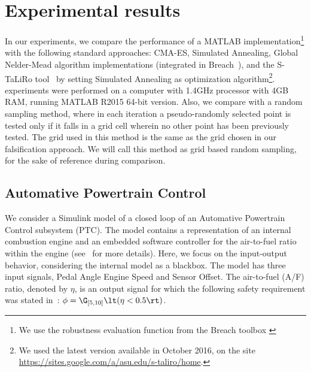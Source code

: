 \section{Experimental results}

In our experiments, we compare the performance of a MATLAB
implementation\footnote{We use the robustness evaluation function from
the Breach toolbox \cite{}}
with the following standard approaches: CMA-ES, Simulated Annealing, Global
Nelder-Mead algorithm implementations (integrated in
Breach~\cite{BreachCAV10}), and the S-TaLiRo tool~\cite{TaliroLFS11}
by setting Simulated Annealing as optimization algorithm\footnote{We
used the latest version available in October 2016, on the
site \url{https://sites.google.com/a/asu.edu/s-taliro/home}.}. %
experiments were performed on a computer with 1.4GHz processor with
4GB RAM, running MATLAB R2015 64-bit version.  Also, we compare with a
random sampling method, where in each iteration a pseudo-randomly
selected point is tested only if it falls in a grid cell wherein no
other point has been previously tested.  The grid used in this method
is the same as the grid chosen in our falsification approach.  We will
call this method as grid based random sampling, for the sake of
reference during comparison.


\vspace{-1em}
\subsection{Automative Powertrain Control} \label{sec:PTC}
We consider a Simulink model of a closed loop of an Automative Powertrain Control
subsystem (PTC). The model contains a representation of an internal combustion engine and an
embedded software controller for the air-to-fuel ratio within the
engine (see~\cite{Dreossi2015} for more details). Here, we
focus on the input-output behavior, considering the
internal model as a blackbox. The model has three input signals,
Pedal Angle Engine Speed and Sensor Offset.
The air-to-fuel (A/F) ratio, denoted by $\eta$, is an
output signal for which the following safety requirement was stated
in~\cite{Dreossi2015}: $\phi = \G_{[5,10]}\lt(\eta<0.5\rt)$.

